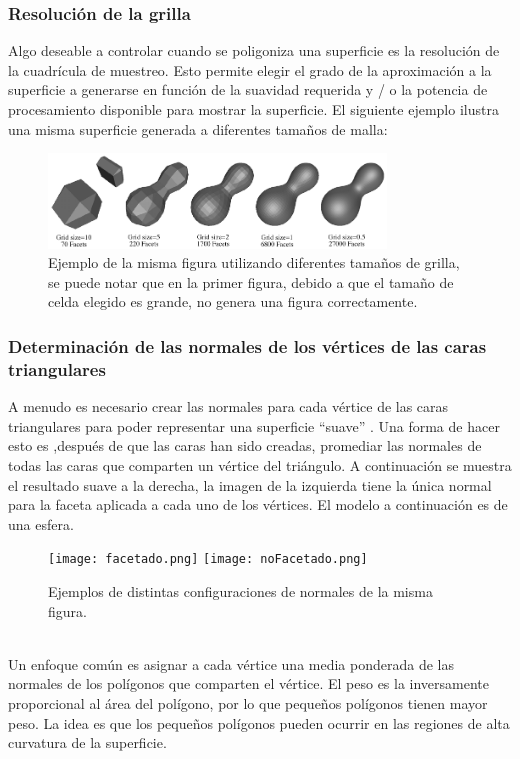 \documentclass[12pt]{article}
\begin{document}
\subsubsection{Resolución de la grilla}
Algo deseable a controlar cuando se poligoniza una superficie es la resolución de la cuadrícula de muestreo. Esto permite elegir el grado de la aproximación a la superficie a generarse en función de la suavidad requerida y / o la potencia de procesamiento disponible para mostrar la superficie. El siguiente ejemplo ilustra una misma superficie generada a diferentes tamaños de malla:
\clearpage
\begin{figure}[h!]
\includegraphics[width=0.8\textwidth,center]{marchingcubes4.png}
\caption{Ejemplo de la misma figura utilizando diferentes tamaños de grilla, se puede notar que en la primer figura, debido a que el tamaño de celda elegido es grande, no genera una figura correctamente.}
\end{figure}
\subsubsection{Determinación de las normales de los vértices de las caras triangulares}
A menudo es necesario crear las normales para cada vértice de las caras triangulares para poder representar una superficie “suave” \cite{realtimerendering}. Una forma de hacer esto es ,después de que las caras han sido creadas, promediar las normales de todas las caras que comparten un vértice del triángulo. A continuación se muestra el resultado suave a la derecha, la imagen de la izquierda tiene la única normal para la faceta aplicada a cada uno de los vértices. El modelo a continuación es de una esfera.\\
\begin{figure}[h]
\texttt{[image: facetado.png]}
\hfill
\texttt{[image: noFacetado.png]}
\caption{ Ejemplos de distintas configuraciones de normales de la misma figura.}
\label{ fig : surface }
\end{figure}
\\Un enfoque común es asignar a cada vértice una media ponderada de las normales de los polígonos que comparten el vértice. El peso es la inversamente proporcional al área del polígono, por lo que pequeños polígonos tienen mayor peso. La idea es que los pequeños polígonos pueden ocurrir en las regiones de alta curvatura de la superficie.
\end{document}
